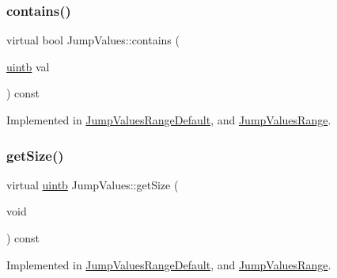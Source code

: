 \mbox{\label{class_jump_values_a870c42f3098324112496fdb03572cf3a}} 
\subsubsection{\texorpdfstring{contains()}{contains()}}
{\footnotesize\ttfamily virtual bool Jump\+Values\+::contains (\begin{DoxyParamCaption}\item[{\mbox{\hyperlink{types_8h_a2db313c5d32a12b01d26ac9b3bca178f}{uintb}}}]{val }\end{DoxyParamCaption}) const\hspace{0.3cm}{\ttfamily [pure virtual]}}



Implemented in \mbox{\hyperlink{class_jump_values_range_default_a6f7f9429f60a706f419d4c834fdf4943}{Jump\+Values\+Range\+Default}}, and \mbox{\hyperlink{class_jump_values_range_ac498609bd6eb43a1b7d1d5bc3ad2152b}{Jump\+Values\+Range}}.

\mbox{\label{class_jump_values_abe5edd38ba4e0e00f68e1d5932f338bc}} 
\subsubsection{\texorpdfstring{getSize()}{getSize()}}
{\footnotesize\ttfamily virtual \mbox{\hyperlink{types_8h_a2db313c5d32a12b01d26ac9b3bca178f}{uintb}} Jump\+Values\+::get\+Size (\begin{DoxyParamCaption}\item[{void}]{ }\end{DoxyParamCaption}) const\hspace{0.3cm}{\ttfamily [pure virtual]}}



Implemented in \mbox{\hyperlink{class_jump_values_range_default_a079bd26853aa52ccac577fd39c1a3e3e}{Jump\+Values\+Range\+Default}}, and \mbox{\hyperlink{class_jump_values_range_aabad0182df2b5178abcb597278a4ec20}{Jump\+Values\+Range}}.

\mbox{\label{class_jump_values_a1b1beeebd8a33f7710f30c495f130993}} 
